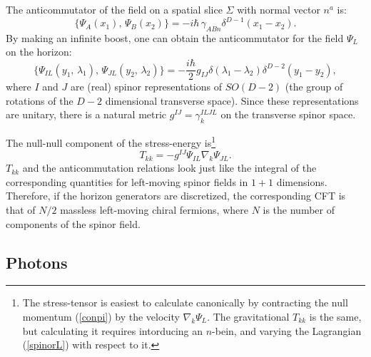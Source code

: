 \documentclass[12pt]{article}
\begin{document}
The anticommutator of the field on a spatial slice $\Sigma$ with normal vector $n^a$ is:
\begin{equation}
\{ \Psi_A(x_1) ,\, \Psi_B(x_2) \} = -i\hbar\,\gamma_{ABn} \delta^{D-1}(x_1 - x_2).
\end{equation}
By making an infinite boost, one can obtain the anticommutator for the field $\Psi_L$ on the horizon:
\begin{equation}
\{ \Psi_{IL}(y_1,\,\lambda_1) ,\, \Psi_{JL}(y_2,\,\lambda_2) \} =
-\frac{i\hbar}{2} g_{IJ} \delta(\lambda_1 - \lambda_2) \delta^{D-2}(y_1 - y_2),
\end{equation}
where $I$ and $J$ are (real) spinor representations of $SO(D - 2)$ (the group of rotations of the $D - 2$ dimensional transverse space).  Since these representations are unitary, there is a natural metric $g^{IJ} = \gamma^{ILJL}_k$ on the transverse spinor space.

The null-null component of the stress-energy is\footnote{The stress-tensor is easiest to calculate canonically by contracting the null momentum (\ref{conpi}) by the velocity $\nabla_k \Psi_L$.  The gravitational $T_{kk}$ is the same, but calculating it requires intorducing an $n$-bein, and varying the Lagrangian (\ref{spinorL}) with respect to it.}
\begin{equation}
T_{kk} = -g^{IJ} \Psi_{IL} \nabla_k \Psi_{JL}.
\end{equation}
$T_{kk}$ and the anticommutation relations look just like the integral of the corresponding quantities for left-moving spinor fields in $1+1$ dimensions.  Therefore, if the horizon generators are discretized, the corresponding CFT is that of $N/2$ massless left-moving chiral fermions, where $N$ is the number of components of the spinor field.

\subsection{Photons}\label{phot}
\end{document}
